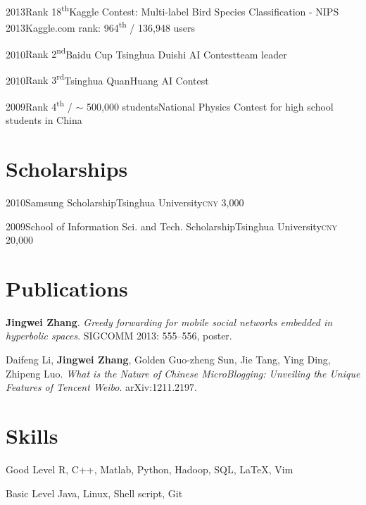 \documentclass{tccv}
\begin{document}
\begin{yearlist}

\item{2013}{Rank 18\textsuperscript{th}}{Kaggle Contest: Multi-label Bird Species Classification - NIPS 2013}{Kaggle.com rank: 964\textsuperscript{th} / 136,948 users}{}

\item{2010}{Rank 2\textsuperscript{nd}}{Baidu Cup Tsinghua Duishi AI Contest}{}{team leader}

\item{2010}{Rank 3\textsuperscript{rd}}{Tsinghua QuanHuang AI Contest}{}{}

\item{2009}{Rank 4\textsuperscript{th} / $\sim$ 500,000 students}{National Physics Contest for high school students in China}{}{}



\end{yearlist}

\section{Scholarships}

\begin{yearlist}

\item{2010}{Samsung Scholarship}{Tsinghua University}{}{\textsc{cny} 3,000}
\item{2009}{School of Information Sci. and Tech. Scholarship}{Tsinghua University}{}{\textsc{cny} 20,000}


\end{yearlist}

\section{Publications}

\textbf{Jingwei Zhang}.
\emph{Greedy forwarding for mobile social networks embedded in hyperbolic spaces}.
SIGCOMM 2013: 555--556, poster.\medskip

Daifeng Li, \textbf{Jingwei Zhang}, Golden Guo-zheng Sun, Jie Tang, Ying
Ding, Zhipeng Luo.
\emph{What is the Nature of Chinese MicroBlogging: Unveiling the Unique Features of Tencent Weibo}.
arXiv:1211.2197.\medskip

\section{Skills}

\begin{factlist}

\item{Good Level}
      {R, C++, Matlab, Python, Hadoop, SQL, \LaTeX, Vim}

\item{Basic Level}
      {Java, Linux, Shell script, Git}

\end{factlist}
\end{document}
